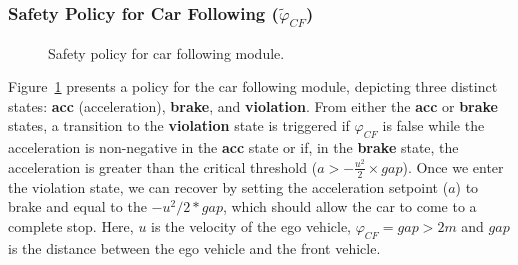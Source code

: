 \subsubsection{Safety Policy for Car Following ($\tilde{\varphi}_{CF}$)}
\label{sec:cf_policy}


\begin{figure}[htbp]
 \caption{Safety policy for car following module. %
 }
    \label{fig:refactored_cf_policy_combined}
\end{figure}

Figure~\ref{fig:refactored_cf_policy_combined} presents a policy for the car following module, depicting three distinct states: \textbf{acc} (acceleration), \textbf{brake}, and \textbf{violation}. From either the \textbf{acc} or \textbf{brake} states, a transition to the \textbf{violation} state is triggered if \(\varphi_{CF}\) is false while the acceleration is non-negative in the \textbf{acc} state or if, in the \textbf{brake} state, the acceleration is greater than the critical threshold (\(a > -\frac{u^2}{2}\times gap\)). Once we enter the violation state, we can recover by setting the acceleration setpoint ($a$) to brake and equal to the $-u^2/2*gap$, which should allow the car to come to a complete stop. Here, $u$ is the velocity of the ego vehicle, $\varphi_{CF} = gap > 2m$ and $gap$ is the distance between the ego vehicle and the front vehicle.








